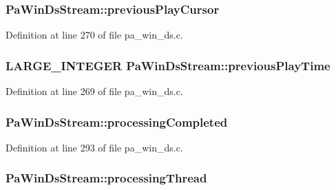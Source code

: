 \subsubsection[{\texorpdfstring{previous\+Play\+Cursor}{previousPlayCursor}}]{ Pa\+Win\+Ds\+Stream\+::previous\+Play\+Cursor}\hypertarget{struct_pa_win_ds_stream_a89734a0c1089e6451603807450366035}{}\label{struct_pa_win_ds_stream_a89734a0c1089e6451603807450366035}


Definition at line 270 of file pa\+\_\+win\+\_\+ds.\+c.

\subsubsection[{\texorpdfstring{previous\+Play\+Time}{previousPlayTime}}]{\setlength{\rightskip}{0pt plus 5cm}L\+A\+R\+G\+E\+\_\+\+I\+N\+T\+E\+G\+ER Pa\+Win\+Ds\+Stream\+::previous\+Play\+Time}\hypertarget{struct_pa_win_ds_stream_acb8b10d5f65fe09ff39316b62c9da6aa}{}\label{struct_pa_win_ds_stream_acb8b10d5f65fe09ff39316b62c9da6aa}


Definition at line 269 of file pa\+\_\+win\+\_\+ds.\+c.

\subsubsection[{\texorpdfstring{processing\+Completed}{processingCompleted}}]{ Pa\+Win\+Ds\+Stream\+::processing\+Completed}\hypertarget{struct_pa_win_ds_stream_a1350d5353edd1819d5ae4fec49480161}{}\label{struct_pa_win_ds_stream_a1350d5353edd1819d5ae4fec49480161}


Definition at line 293 of file pa\+\_\+win\+\_\+ds.\+c.

\subsubsection[{\texorpdfstring{processing\+Thread}{processingThread}}]{ Pa\+Win\+Ds\+Stream\+::processing\+Thread}\hypertarget{struct_pa_win_ds_stream_ae08a211344c6db03acbf07cbd001f2b5}{}\label{struct_pa_win_ds_stream_ae08a211344c6db03acbf07cbd001f2b5}



